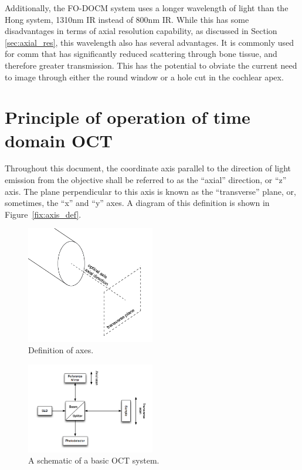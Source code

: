 Additionally, the FO-DOCM system uses a longer wavelength of light than the Hong system, 1310nm IR instead of 800nm IR. While this has some disadvantages in terms of axial resolution capability, as discussed in Section \ref{sec:axial_res}, this wavelength also has several advantages. It is commonly used for comm that has significantly reduced scattering through bone tissue, and therefore greater transmission. This has the potential to obviate the current need to image through either the round window or a hole cut in the cochlear apex. \cite{needcitation}

\section{Principle of operation of time domain OCT}
\label{sec:principles_oct}

Throughout this document, the coordinate axis parallel to the direction of light emission from the objective shall be referred to as the ``axial'' direction, or ``z'' axis. The plane perpendicular to this axis is known as the ``transverse'' plane, or, sometimes, the ``x'' and ``y'' axes. A diagram of this definition is shown in Figure~\ref{fix:axis_def}.

\begin{figure}[h!]
\centering
\includegraphics[width=0.5\textwidth]{Images/Background/axes.png}
\caption{Definition of axes.\label{fig:axis_def}}
\end{figure}

\begin{figure}[h!]
  \centering
    \includegraphics[width=0.5\textwidth]{Images/Background/basic_oct.png}
      \caption{A schematic of a basic OCT system.\label{fig:basic_oct}}
\end{figure}


